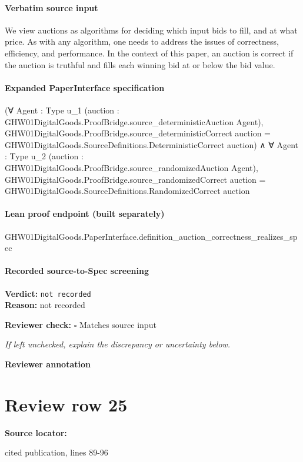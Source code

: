 \documentclass[10pt]{article}
\newcommand{\reviewerbox}{%
  \par\noindent\fbox{\parbox{0.96\linewidth}{\rule{0pt}{0.38in}}}\par
}
\newcommand{\reviewmatch}[1]{%
  \par\noindent\textbf{Reviewer check:} $\square$\; #1\par
  \noindent\emph{If left unchecked, explain the discrepancy or uncertainty below.}\par
}
\begin{document}
\paragraph{Verbatim source input}
\begin{ReviewVerbatim}
We view auctions as algorithms for deciding which
input bids to fill, and at what price. As with any algorithm, one needs to address the issues of correctness,
efficiency, and performance. In the context of this
paper, an auction is correct if the auction is truthful
and fills each winning bid at or below the bid value.
\end{ReviewVerbatim}


\paragraph{Expanded PaperInterface specification}
\begin{ReviewVerbatim}
(∀ {Agent : Type u_1} (auction : GHW01DigitalGoods.ProofBridge.source_deterministicAuction Agent),
    GHW01DigitalGoods.ProofBridge.source_deterministicCorrect auction =
      GHW01DigitalGoods.SourceDefinitions.DeterministicCorrect auction) ∧
  ∀ {Agent : Type u_2} (auction : GHW01DigitalGoods.ProofBridge.source_randomizedAuction Agent),
    GHW01DigitalGoods.ProofBridge.source_randomizedCorrect auction =
      GHW01DigitalGoods.SourceDefinitions.RandomizedCorrect auction
\end{ReviewVerbatim}

\paragraph{Lean proof endpoint (built separately)}\begin{ReviewVerbatim}
GHW01DigitalGoods.PaperInterface.definition_auction_correctness_realizes_spec
\end{ReviewVerbatim}

\paragraph{Recorded source-to-Spec screening}
\textbf{Verdict:} \texttt{not recorded}
\\
\textbf{Reason:} not recorded
\reviewmatch{Matches source input}
\noindent\textbf{Reviewer annotation}\par
\reviewerbox
\clearpage
\hypertarget{source-claim-ce5033b86185a6e5}{}
\section*{Review row 25}
\textbf{Source locator:} {\footnotesize\raggedright cited publication, lines 89-\allowbreak{}96\par}
\end{document}
